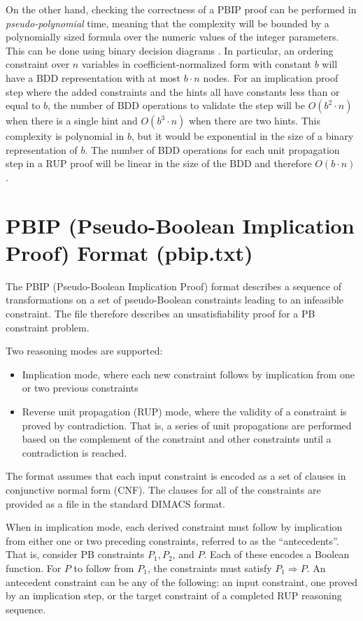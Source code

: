 \documentclass{fmcad}
\begin{document}
On the other hand, checking the correctness of a PBIP proof can be performed in
\textit{pseudo-polynomial} time, meaning that the complexity will be bounded by a polynomially sized
formula over the numeric values of the integer parameters. This can be done using binary decision
diagrams \cite{bryant2022clausal}. In particular, an ordering constraint over $n$ variables in
coefficient-normalized form with constant $b$ will have a BDD representation with at most $b \cdot n$
nodes. For an implication proof step where the added constraints and the hints all have constants
less than or equal to $b$, the number of BDD operations to validate the step will be $O(b^2 \cdot n)$
when there is a single hint and $O(b^3 \cdot n)$ when there are two hints. This complexity is
polynomial in $b$, but it would be exponential in the size of a binary representation of $b$. The
number of BDD operations for each unit propagation step in a RUP proof will be linear in the size
of the BDD and therefore $O(b \cdot n)$.

\section{PBIP (Pseudo-Boolean Implication Proof) Format (pbip.txt)}

The PBIP (Pseudo-Boolean Implication Proof) format describes a sequence of transformations on
a set of pseudo-Boolean constraints leading to an infeasible constraint. The file therefore
describes an unsatisfiability proof for a PB constraint problem.

Two reasoning modes are supported:
\begin{itemize}
\item Implication mode, where each new constraint follows by implication from one or two
  previous constraints
\item Reverse unit propagation (RUP) mode, where the validity of a constraint is proved by
  contradiction. That is, a series of unit propagations are performed based on the complement of
  the constraint and other constraints until a contradiction is reached.
\end{itemize}

The format assumes that each input constraint is encoded as a set of clauses in conjunctive normal
form (CNF). The clauses for all of the constraints are provided as a file in the standard DIMACS
format.

When in implication mode, each derived constraint must follow by implication from either one or two
preceding constraints, referred to as the ``antecedents''. That is, consider PB constraints $P_1,
P_2$, and $P$. Each of these encodes a Boolean function. For $P$ to follow from $P_1$, the constraints
must satisfy $P_1 \Longrightarrow P$. An antecedent constraint can be any of the following: an input
constraint, one proved by an implication step, or the target constraint of a completed RUP reasoning
sequence.
\end{document}
